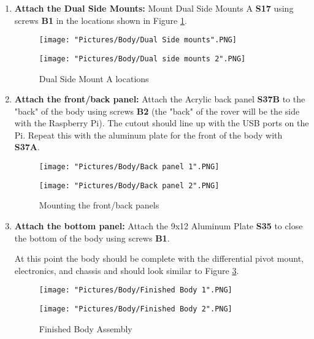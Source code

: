 \documentclass[12pt]{article}
\begin{document}
\begin{enumerate}

\item \textbf{Attach the Dual Side Mounts:} Mount Dual Side Mounts A \textbf{S17} using screws \textbf{B1} in the locations shown in Figure \ref{Dual Side Mounts}.

\begin{figure}[H]
  \centering
  \begin{minipage}[b]{0.40\textwidth}
    \texttt{[image: "Pictures/Body/Dual Side mounts".PNG]}
  \end{minipage}
  \hfill
  \begin{minipage}[b]{0.40\textwidth}
    \texttt{[image: "Pictures/Body/Dual side mounts 2".PNG]}
  \end{minipage}
  \caption{Dual Side Mount A locations}
  \label{Dual Side Mounts}
\end{figure}

\item \textbf{Attach the front/back panel: } Attach the Acrylic back panel \textbf{S37B} to the "back" of the body using screws \textbf{B2} (the "back" of the rover will be the side with the Raspberry Pi). The cutout should line up with the USB ports on the Pi. Repeat this with the aluminum plate for the front of the body with \textbf{S37A}.

\begin{figure}[H]
  \centering
  \begin{minipage}[b]{0.40\textwidth}
    \texttt{[image: "Pictures/Body/Back panel 1".PNG]}
  \end{minipage}
  \hfill
  \begin{minipage}[b]{0.40\textwidth}
    \texttt{[image: "Pictures/Body/Back panel 2".PNG]}
  \end{minipage}
  \caption{Mounting the front/back panels}
  \label{front/back panels}
\end{figure}

\item \textbf{Attach the bottom panel: } Attach the 9x12 Aluminum Plate \textbf{S35} to close the bottom of the body using screws \textbf{B1}.

At this point the body should be complete with the differential pivot mount, electronics, and chassis and should look similar to Figure \ref{finished body}.

\begin{figure}[H]
  \centering
  \begin{minipage}[b]{0.45\textwidth}
    \texttt{[image: "Pictures/Body/Finished Body 1".PNG]}
  \end{minipage}
  \hfill
  \begin{minipage}[b]{0.45\textwidth}
    \texttt{[image: "Pictures/Body/Finished Body 2".PNG]}
  \end{minipage}
  \caption{Finished Body Assembly}
  \label{finished body}
\end{figure}

\end{enumerate}
\end{document}
